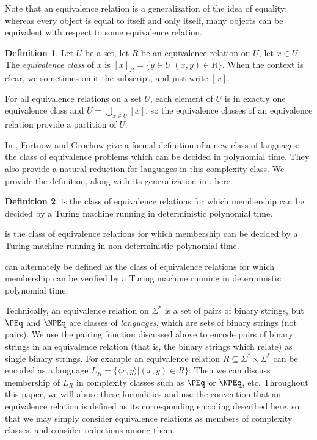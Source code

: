 \documentclass{article}
\theoremstyle{definition} \newtheorem{definition}[definition]{Definition}
\newcommand{\sigmastar}{\Sigma^{*}} %
\newcommand{\defn}[1]{\emph{#1}} %
\newcommand{\pair}[2]{\langle#1,#2\rangle} %
\begin{document}
Note that an equivalence relation is a generalization of the idea of equality;
whereas every object is equal to itself and only itself, many objects can be
equivalent with respect to some equivalence relation.

\begin{definition}
  Let $U$ be a set, let $R$ be an equivalence relation on $U$, let $x\in
  U$. The \defn{equivalence class} of $x$ is $[x]_R=\{y\in U|(x,y)\in
  R\}$. When the context is clear, we sometimes omit the subscript, and just
  write $[x]$.
\end{definition}
For all equivalence relations on a set $U$, each element of $U$ is in exactly
one equivalence class and $U=\bigcup_{x\in U}{[x]}$, so the equivalence classes
of an equivalence relation provide a partition of $U$.

In \cite{fg09}, Fortnow and Grochow give a formal definition of a new class of
languages: the class of equivalence problems which can be decided in polynomial
time. They also provide a natural reduction for languages in this complexity
class. We provide the definition, along with its generalization in \NP, here.

\begin{definition}\label{def:peq}
  \defn{\PEq} is the class of equivalence relations for which membership can be
  decided by a Turing machine running in deterministic polynomial time.

  \defn{\NPEq} is the class of equivalence relations for which membership can
  be decided by a Turing machine running in non-deterministic polynomial time.

  \defn{\NPEq} can alternately be defined as the class of equivalence relations
  for which membership can be verified by a Turing machine running in
  deterministic polynomial time.
\end{definition}

Technically, an equivalence relation on $\sigmastar$ is a set of pairs of
binary strings, but $\PEq$ and $\NPEq$ are classes of \emph{languages}, which
are sets of binary strings (not pairs). We use the pairing function discussed
above to encode pairs of binary strings in an equivalence relation (that is,
the binary strings which relate) as single binary strings. For example an
equivalence relation $R\subseteq\sigmastar\times\sigmastar$ can be encoded as a
language $L_R=\{\pair{x}{y}|(x,y)\in R\}$. Then we can discuss membership of
$L_R$ in complexity classes such as $\PEq$ or $\NPEq$, etc. Throughout this
paper, we will abuse these formalities and use the convention that an
equivalence relation is defined as its corresponding encoding described here,
so that we may simply consider equivalence relations as members of complexity
classes, and consider reductions among them.
\end{document}
